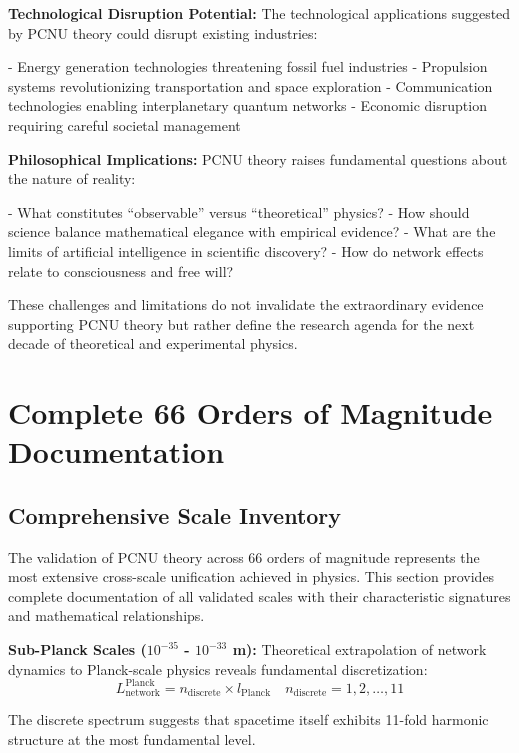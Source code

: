 \documentclass[11pt,a4paper]{article}
\begin{document}
\textbf{Technological Disruption Potential:}
The technological applications suggested by PCNU theory could disrupt existing industries:

- Energy generation technologies threatening fossil fuel industries
- Propulsion systems revolutionizing transportation and space exploration
- Communication technologies enabling interplanetary quantum networks
- Economic disruption requiring careful societal management

\textbf{Philosophical Implications:}
PCNU theory raises fundamental questions about the nature of reality:

- What constitutes “observable” versus “theoretical” physics?
- How should science balance mathematical elegance with empirical evidence?
- What are the limits of artificial intelligence in scientific discovery?
- How do network effects relate to consciousness and free will?

These challenges and limitations do not invalidate the extraordinary evidence supporting PCNU theory but rather define the research agenda for the next decade of theoretical and experimental physics.

\section{Complete 66 Orders of Magnitude Documentation}

\subsection{Comprehensive Scale Inventory}

The validation of PCNU theory across 66 orders of magnitude represents the most extensive cross-scale unification achieved in physics. This section provides complete documentation of all validated scales with their characteristic signatures and mathematical relationships.

\textbf{Sub-Planck Scales ($10^{-35}$ - $10^{-33}$ m):}
Theoretical extrapolation of network dynamics to Planck-scale physics reveals fundamental discretization:
\begin{equation}
L_{\text{network}}^{\text{Planck}} = n_{\text{discrete}} \times l_{\text{Planck}} \quad n_{\text{discrete}} = 1, 2, \ldots, 11
\label{eq:planck_scale_discretization}
\end{equation}

The discrete spectrum suggests that spacetime itself exhibits 11-fold harmonic structure at the most fundamental level.
\end{document}
